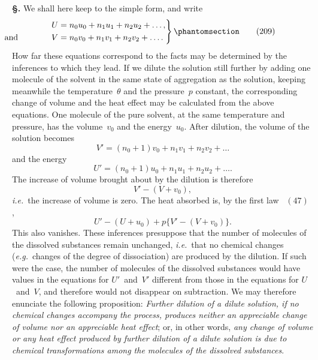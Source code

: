\documentclass[12pt]{book}[2005/09/16]
\newcommand{\Chg}[2]{#2}
\newcommand{\Add}[1]{\Chg{}{#1}}
\newcommand{\Section}[1]{
  \medskip\par\textbf{§\;#1}
  \label{section:#1}
}
\newcommand{\Tag}[1]{%
  \phantomsection\label{eqn:#1}\tag*{\ensuremath{#1}}%
}
\newcommand{\Eq}[1]{%
  \hyperref[eqn:#1]{\ensuremath{#1}}%
}
\newcommand{\PageSep}[1]{\ignorespaces}
\newcommand{\eg}{\emph{e.g.}}
\newcommand{\ie}{\emph{i.e.}}
\begin{document}
\Section{253.} We shall here keep to the simple form, and write
\[
\left.
\begin{aligned}
U &= n_{0} u_{0} + n_{1} u_{1} + n_{2} u_{2} + \dots\Add{,} \\
\llap{\text{and\qquad\qquad}}
V &= n_{0} v_{0} + n_{1} v_{1} + n_{2} v_{2} + \dots\Add{.}
\end{aligned}
\right\}
\Tag{(209)}
\]
How far these equations correspond to the facts may be
determined by the inferences to which they lead. If we
dilute the solution still further by adding one molecule of
the solvent in the same state of aggregation as the solution,
keeping meanwhile the temperature~$\theta$ and the pressure~$p$
constant, the corresponding change of volume and the heat
effect may be calculated from the above equations. One
molecule of the pure solvent, at the same temperature and
pressure, has the volume~$v_{0}$ and the energy~$u_{0}$. After dilution,
the volume of the solution becomes
\[
V' = (n_{0} + 1) v_{0} + n_{1} v_{1} + n_{2} v_{2} + \dots
\]
and the energy
\[
U' = (n_{0} + 1) u_{0} + n_{1} u_{1} + n_{2} u_{2} + \dots\Add{.}
\]
The increase of volume brought about by the dilution is
therefore
\[
V' - (V + v_{0}),
\]
\ie\ the increase of volume is zero. The heat absorbed is, by
the first law~\Eq{(47)},
\[
U' - (U + u_{0}) + p \bigl\{V' - (V + v_{0})\bigr\}.
\]
\PageSep{226}
This also vanishes. These inferences presuppose that the
number of molecules of the dissolved substances remain
unchanged, \ie\ that no chemical changes (\eg\ changes of
the degree of dissociation) are produced by the dilution. If
such were the case, the number of molecules of the dissolved
substances would have values in the equations for $U'$~and~$V'$
different from those in the equations for $U$~and~$V$, and therefore
would not disappear on subtraction. We may therefore
enunciate the following proposition: \emph{Further dilution of a
dilute solution, if no chemical changes accompany the process,
produces neither an appreciable change of volume nor an
appreciable heat effect}; or, in other words, \emph{any change of
volume or any heat effect produced by further dilution of a
dilute solution is due to chemical transformations among the
molecules of the dissolved substances}.
\end{document}

